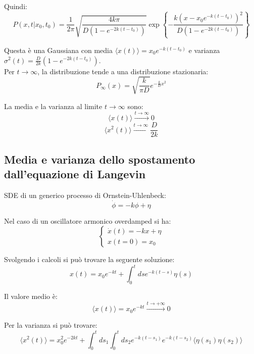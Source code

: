 Quindi:
\begin{equation}
P(x,t|x_{0},t_{0}) = \frac{1}{2\pi} \sqrt{\frac{4k \pi}{D(1-e^{-2k(t-t_0)})}} \exp\left\{-\frac{k(x-x_0e^{-k(t-t_0)})^2}{D(1-e^{-2k(t-t_0)})}\right\}
\end{equation}

Questa è una Gaussiana con media $\langle x(t) \rangle = x_0e^{-k(t-t_0)}$
e varianza $\sigma^2(t) = \frac{D}{2k}(1-e^{-2k(t-t_0)})$.\\
Per $t \rightarrow \infty$, la distribuzione tende a una distribuzione stazionaria:
\begin{equation}
P_{\infty}(x) = \sqrt{\frac{k}{\pi D}}e^{-\frac{k}{D}x^{2}}
\end{equation}

La media e la varianza al limite $t \rightarrow \infty$ sono:
\begin{equation}
\langle x(t) \rangle \xrightarrow{t\rightarrow\infty} 0
\end{equation}
\begin{equation}
\langle x^{2}(t) \rangle\xrightarrow{t\rightarrow\infty} \frac{D}{2k}
\end{equation}

\subsection{Media e varianza dello spostamento dall'equazione di Langevin}
SDE di un generico processo di Ornstein-Uhlenbeck:
\begin{equation} \dot{\phi} =- k \phi+ \eta \end{equation}

Nel caso di un oscillatore armonico overdamped si ha:
\begin{equation} \begin{cases}
\dot{x}(t) = -kx + \eta \\ x(t=0)=x_0\end{cases}
\end{equation}

Svolgendo i calcoli si può trovare la seguente soluzione:
\begin{equation}
x(t) = x_0 e^{-kt} + \int_0^t ds e^{-k(t-s)}\eta(s) \end{equation}

Il valore medio è:
\begin{equation} \langle x(t) \rangle = x_0 e^{-kt} \xrightarrow{t\rightarrow+\infty} 0 \end{equation}

Per la varianza si può trovare:
\begin{equation} \langle x^2(t) \rangle = x_0^2 e^{-2kt} + \int_0^t ds_1 \int_0^t ds_2 e^{-k(t-s_1)}e^{-k(t-s_2)} \langle \eta(s_1)\eta(s_2) \rangle \end{equation}

